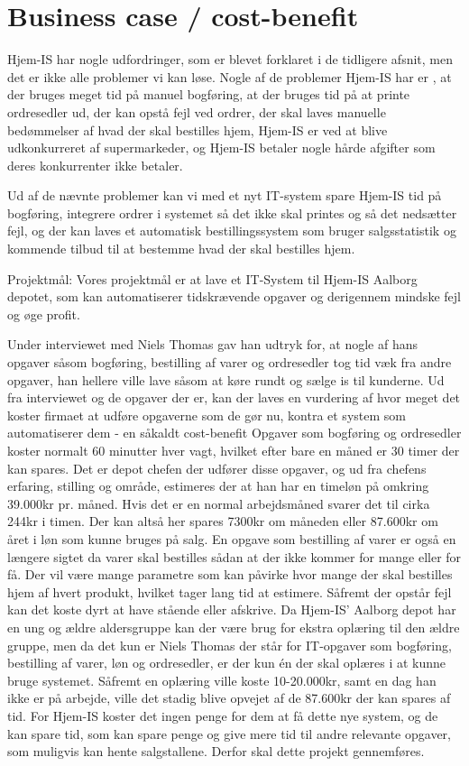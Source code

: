 \section{Business case / cost-benefit}\label{businesscase}
Hjem-IS har nogle udfordringer, som er blevet forklaret i de tidligere afsnit, men det er ikke alle problemer vi kan løse. Nogle af de problemer Hjem-IS har er , at der bruges meget tid på manuel bogføring, at der bruges tid på at printe ordresedler ud, der kan opstå fejl ved ordrer, der skal laves manuelle bedømmelser af hvad der skal bestilles hjem, Hjem-IS er ved at blive udkonkurreret af supermarkeder, og Hjem-IS betaler nogle hårde afgifter som deres konkurrenter ikke betaler.

Ud af de nævnte problemer kan vi med et nyt IT-system spare Hjem-IS tid på bogføring, integrere ordrer i systemet så det ikke skal printes og så det nedsætter fejl, og der kan laves et automatisk bestillingssystem som bruger salgsstatistik og kommende tilbud til at bestemme hvad der skal bestilles hjem. 

Projektmål:
Vores projektmål er at lave et IT-System til Hjem-IS Aalborg depotet, som kan automatiserer tidskrævende opgaver og derigennem mindske fejl og øge profit.

Under interviewet med Niels Thomas gav han udtryk for, at nogle af hans opgaver såsom bogføring, bestilling af varer og ordresedler tog tid væk fra andre opgaver, han hellere ville lave såsom at køre rundt og sælge is til kunderne. 
Ud fra interviewet og de opgaver der er, kan der laves en vurdering af hvor meget det koster firmaet at udføre opgaverne som de gør nu, kontra et system som automatiserer dem - en såkaldt cost-benefit\cite{Costbenefit}
Opgaver som bogføring og ordresedler koster normalt 60 minutter hver vagt, hvilket efter bare en måned er 30 timer der kan spares. Det er depot chefen der udfører disse opgaver, og ud fra chefens erfaring, stilling og område, estimeres der at han har en timeløn på omkring 39.000kr pr. måned\cite{Lagerchef}. Hvis det er en normal arbejdsmåned svarer det til cirka 244kr i timen. Der kan altså her spares 7300kr om måneden eller 87.600kr om året i løn som kunne bruges på salg. 
En opgave som bestilling af varer er også en længere sigtet da varer skal bestilles sådan at der ikke kommer for mange eller for få. Der vil være mange parametre som kan påvirke hvor mange der skal bestilles hjem af hvert produkt, hvilket tager lang tid at estimere. Såfremt der opstår fejl kan det koste dyrt at have stående eller afskrive. 
Da Hjem-IS’ Aalborg depot har en ung og ældre aldersgruppe kan der være brug for ekstra oplæring til den ældre gruppe, men da det kun er Niels Thomas der står for IT-opgaver som bogføring, bestilling af varer, løn og ordresedler, er der kun én der skal oplæres i at kunne bruge systemet. Såfremt en oplæring ville koste 10-20.000kr, samt en dag han ikke er på arbejde, ville det stadig blive opvejet af de 87.600kr der kan spares af tid.
For Hjem-IS koster det ingen penge for dem at få dette nye system, og de kan spare tid, som kan spare penge og give mere tid til andre relevante opgaver, som muligvis kan hente salgstallene. Derfor skal dette projekt gennemføres.

